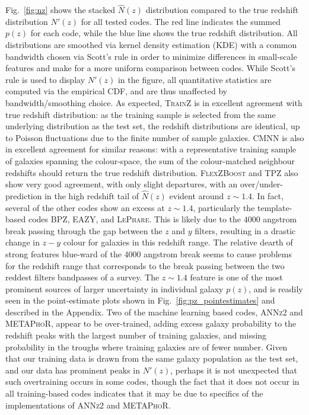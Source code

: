 Fig.~\ref{fig:nz} shows the stacked $\hat{N}(z)$ distribution compared to the true redshift distribution $N'(z)$ for all tested codes.  The red line indicates the summed $p(z)$ for each code, while the blue line shows the true redshift distribution. All distributions are smoothed via kernel density estimation (KDE) with a common bandwidth chosen via Scott's rule \citep{Scott:1992} in order to minimize differences in small-scale features and make for a more uniform comparison between codes.  While Scott's rule is used to display $N'(z)$ in the figure, all quantitative statistics are computed via the empirical CDF, and are thus unaffected by bandwidth/smoothing choice.
As expected, \textsc{TrainZ} is in excellent agreement with true redshift distribution: as the training sample is selected from the same underlying distribution as the test set, the redshift distributions are identical, up to Poisson fluctuations due to the finite number of sample galaxies.  \textsc{CMNN} is also in excellent agreement for similar reasons: with a representative training sample of galaxies spanning the colour-space, the sum of the colour-matched neighbour redshifts should return the true redshift distribution. \textsc{FlexZBoost} and \textsc{TPZ} also show very good agreement, with only slight departures, with an over/under-prediction in the high redshift tail of $\hat{N}(z)$ evident around $z\sim1.4$.  In fact, several of the other codes show an excess at $z \sim 1.4$, particularly the template-based codes \textsc{BPZ}, \textsc{EAZY}, and \textsc{LePhare}.
This is likely due to the $4000$ angstrom break passing through the gap between the $z$ and $y$ filters, resulting in a drastic change in $z-y$ colour for galaxies in this redshift range.  The relative dearth of strong features blue-ward of the 4000 angstrom break seems to cause problems for the redshift range that corresponds to the break passing between the two reddest filters bandpasses of a survey.
The $z\sim1.4$ feature is one of the most prominent sources of larger uncertainty in individual galaxy $p(z)$, and is readily seen in the point-estimate plots shown in Fig.~\ref{fig:pz_pointestimates} and described in the Appendix.
Two of the machine learning based codes, \textsc{ANNz2} and \textsc{METAPhoR}, appear to be over-trained, adding excess galaxy probability to the redshift peaks with the largest number of training galaxies, and missing probability in the troughs where training galaxies are of fewer number.
Given that our training data is drawn from the same galaxy population as the test set, and our data has prominent peaks in $N'(z)$, perhaps it is not unexpected that such overtraining occurs in some codes, though the fact that it does not occur in all training-based codes indicates that it may be due to specifics of the implementations of \textsc{ANNz2} and \textsc{METAPhoR}.
